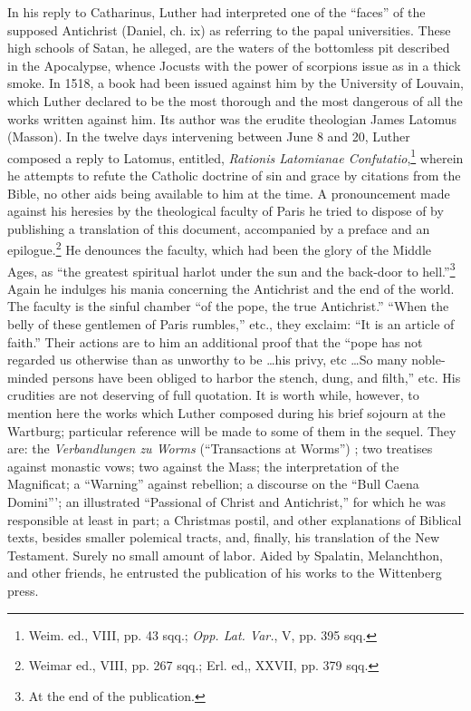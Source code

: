 In his reply to Catharinus, Luther had interpreted one of the
“faces” of the supposed Antichrist (Daniel, ch. ix) as referring to
the papal universities. These high schools of Satan, he alleged, are
the waters of the bottomless pit described in the Apocalypse, whence
Jocusts with the power of scorpions issue as in a thick smoke. In
1518, a book had been issued against him by the University of
Louvain, which Luther declared to be the most thorough and the most
dangerous of all the works written against him. Its author was the
erudite theologian James Latomus (Masson). In the twelve days
intervening between June 8 and 20, Luther composed a reply to
Latomus, entitled, \textit{Rationis Latomianae Confutatio},\footnote{Weim. ed., VIII, pp. 43 sqq.; \textit{Opp. Lat. Var.}, V, pp. 395 sqq.}
wherein he attempts to refute the Catholic doctrine of sin and grace by
citations from the Bible, no other aids being available to him at the time.
A pronouncement made against his heresies by the theological faculty
of Paris he tried to dispose of by publishing a translation of this
document, accompanied by a preface and an epilogue.\footnote{Weimar ed., VIII, pp. 267 sqq.; Erl. ed,, XXVII, pp. 379 sqq.}
He denounces
the faculty, which had been the glory of the Middle Ages, as “the
greatest spiritual harlot under the sun and the back-door to hell.”\footnote{At the end of the publication.}
Again he indulges his mania concerning the Antichrist and the end
of the world. The faculty is the sinful chamber “of the pope, the
true Antichrist.” “When the belly of these gentlemen of Paris
rumbles,” etc., they exclaim: “It is an article of faith.” Their actions
are to him an additional proof that the “pope has not regarded us
otherwise than as unworthy to be \dots his privy, etc \dots So many
noble-minded persons have been obliged to harbor the stench, dung,
and filth,” etc. His crudities are not deserving of full quotation.
It is worth while, however, to mention here the works which
Luther composed during his brief sojourn at the Wartburg; particular
reference will be made to some of them in the sequel. They are: the
\textit{Verbandlungen zu Worms} (“Transactions at Worms”) ; two treatises
against monastic vows; two against the Mass; the interpretation of
the Magnificat; a “Warning” against rebellion; a discourse on the
“Bull Caena Domini”’; an illustrated “Passional of Christ and Antichrist,”
for which he was responsible at least in part; a Christmas
postil, and other explanations of Biblical texts, besides smaller polemical
tracts, and, finally, his translation of the New Testament. Surely
no small amount of labor. Aided by Spalatin, Melanchthon, and other
friends, he entrusted the publication of his works to the Wittenberg
press.

